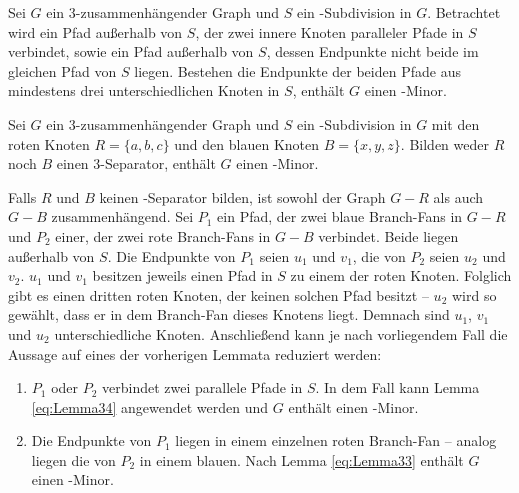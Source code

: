 \begin{lemma}\label{eq:Lemma34}
  Sei $G$ ein $3$-zusammenhängender Graph und $S$ ein \kdd-Subdivision in $G$.
  Betrachtet wird ein Pfad außerhalb von $S$, der zwei innere Knoten paralleler Pfade in $S$ verbindet, sowie ein Pfad außerhalb von $S$, dessen Endpunkte nicht beide im gleichen Pfad von $S$ liegen.
  Bestehen die Endpunkte der beiden Pfade aus mindestens drei unterschiedlichen Knoten in $S$, enthält $G$ einen \kf-Minor.
  \cite{KeM92}
\end{lemma}

\begin{lemma}\label{eq:Lemma35}
  Sei $G$ ein $3$-zusammenhängender Graph und $S$ ein \kdd-Subdivision in $G$ mit den roten Knoten $R = \{a, b, c\}$ und den blauen Knoten $B = \{x, y, z\}$.
  Bilden weder $R$ noch $B$ einen $3$-Separator, enthält $G$ einen \kf-Minor.
  \cite{KeM92}
\end{lemma}
\begin{beweis}
  Falls $R$ und $B$ keinen \dd-Separator bilden, ist sowohl der Graph $G - R$ als auch $G - B$ zusammenhängend.
  Sei $P_1$ ein Pfad, der zwei blaue Branch-Fans in $G - R$ und $P_2$ einer, der zwei rote Branch-Fans in $G - B$ verbindet.
  Beide liegen außerhalb von $S$.
  Die Endpunkte von $P_1$ seien $u_1$ und $v_1$, die von $P_2$ seien $u_2$ und $v_2$.
  $u_1$ und $v_1$ besitzen jeweils einen Pfad in $S$ zu einem der roten Knoten.
  Folglich gibt es einen dritten roten Knoten, der keinen solchen Pfad besitzt -- $u_2$ wird so gewählt, dass er in dem Branch-Fan dieses Knotens liegt.
  Demnach sind $u_1$, $v_1$ und $u_2$ unterschiedliche Knoten.
  Anschließend kann je nach vorliegendem Fall die Aussage auf eines der vorherigen Lemmata reduziert werden:
  \begin{enumerate}
    \item $P_1$ oder $P_2$ verbindet zwei parallele Pfade in $S$.
          In dem Fall kann Lemma \ref{eq:Lemma34} angewendet werden und $G$ enthält einen \kf-Minor.
    \item Die Endpunkte von $P_1$ liegen in einem einzelnen roten Branch-Fan -- analog liegen die von $P_2$ in einem blauen.
          Nach Lemma \ref{eq:Lemma33} enthält $G$ einen \kf-Minor.
  \end{enumerate}
  \cite{KeM92}
\end{beweis}

